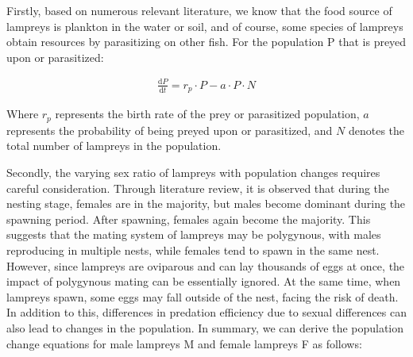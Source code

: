 \documentclass[CTeX = true]{mcmthesis}  %
\begin{document}
Firstly, based on numerous relevant literature, we know that the food source of lampreys is plankton in the water or soil, and of course, some species of lampreys obtain resources by parasitizing on other fish. For the population P that is preyed upon or parasitized:

\begin{equation}
\begin{aligned}
\frac{\mathrm{d} P}{\mathrm{d} t} = r_{p}\cdot P-a \cdot P\cdot N
\end{aligned}
\end{equation}

Where $r_{p}$ represents the birth rate of the prey or parasitized population, $a$ represents the probability of being preyed upon or parasitized, and $N$ denotes the total number of lampreys in the population.

Secondly, the varying sex ratio of lampreys with population changes requires careful consideration. Through literature review, it is observed that during the nesting stage, females are in the majority, but males become dominant during the spawning period. After spawning, females again become the majority. This suggests that the mating system of lampreys may be polygynous, with males reproducing in multiple nests, while females tend to spawn in the same nest. However, since lampreys are oviparous and can lay thousands of eggs at once, the impact of polygynous mating can be essentially ignored. At the same time, when lampreys spawn, some eggs may fall outside of the nest, facing the risk of death. In addition to this, differences in predation efficiency due to sexual differences can also lead to changes in the population. In summary, we can derive the population change equations for male lampreys M and female lampreys F as follows:
\end{document}
